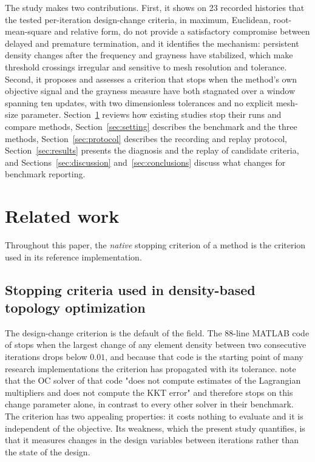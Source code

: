 \documentclass[11pt,a4paper]{article}
\begin{document}
The study makes two contributions. First, it shows on 23 recorded histories that the tested per-iteration design-change criteria, in maximum, Euclidean, root-mean-square and relative form, do not provide a satisfactory compromise between delayed and premature termination, and it identifies the mechanism: persistent density changes after the frequency and grayness have stabilized, which make threshold crossings irregular and sensitive to mesh resolution and tolerance. Second, it proposes and assesses a criterion that stops when the method's own objective signal and the grayness measure have both stagnated over a window spanning ten updates, with two dimensionless tolerances and no explicit mesh-size parameter. Section~\ref{sec:related} reviews how existing studies stop their runs and compare methods, Section~\ref{sec:setting} describes the benchmark and the three methods, Section~\ref{sec:protocol} describes the recording and replay protocol, Section~\ref{sec:results} presents the diagnosis and the replay of candidate criteria, and Sections~\ref{sec:discussion} and~\ref{sec:conclusions} discuss what changes for benchmark reporting.

\section{Related work}
\label{sec:related}

Throughout this paper, the \emph{native} stopping criterion of a method is the criterion used in its reference implementation.

\subsection{Stopping criteria used in density-based topology optimization}

The design-change criterion is the default of the field. The 88-line MATLAB code of \citet{Andreassen2011} stops when the largest change of any element density between two consecutive iterations drops below $0.01$, and because that code is the starting point of many research implementations the criterion has propagated with its tolerance. \citet{RojasLabanda2015} note that the OC solver of that code "does not compute estimates of the Lagrangian multipliers and does not compute the KKT error" and therefore stops on this change parameter alone, in contrast to every other solver in their benchmark. The criterion has two appealing properties: it costs nothing to evaluate and it is independent of the objective. Its weakness, which the present study quantifies, is that it measures changes in the design variables between iterations rather than the state of the design.
\end{document}
